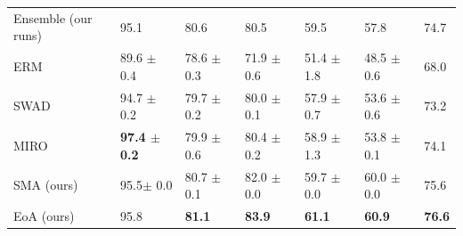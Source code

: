 \begin{table}[]
\begin{tabular}{llllll|l}
Ensemble (our runs) &     95.1        &     80.6       &        80.5       &      59.5     &     57.8       &   74.7 \\
ERM \cite{cha2022domain} & 89.6 $\pm$ 0.4 & 78.6 $\pm$ 0.3 & 71.9 $\pm$ 0.6 & 51.4 $\pm$ 1.8 & 48.5 $\pm$ 0.6 & 68.0 \\
SWAD \cite{cha2022domain}& 94.7 $\pm$ 0.2 & 79.7 $\pm$ 0.2 & 80.0 $\pm$ 0.1 & 57.9 $\pm$ 0.7 & 53.6 $\pm$ 0.6 & 73.2 \\
MIRO \cite{cha2022domain}& \textbf{97.4 $\pm$ 0.2} & 79.9 $\pm$ 0.6 & 80.4 $\pm$ 0.2 & 58.9 $\pm$ 1.3 & 53.8 $\pm$ 0.1 & 74.1\\
 \hline
 \rowcolor{Gray}
SMA (ours)    & {95.5$\pm$ 0.0} & {80.7 $\pm$ 0.1}   & {82.0 $\pm$ 0.0}   & {59.7 $\pm$ 0.0} & {60.0 $\pm$ 0.0} & {75.6} \\ 
\rowcolor{Gray}
EoA (ours) & {95.8}           & \textbf{81.1}           &  \textbf{83.9}  & \textbf{61.1}   &  \textbf{60.9}   & \textbf{76.6} \\
\hline
\end{tabular}
\label{tab:benchmark_full}
\end{table}





